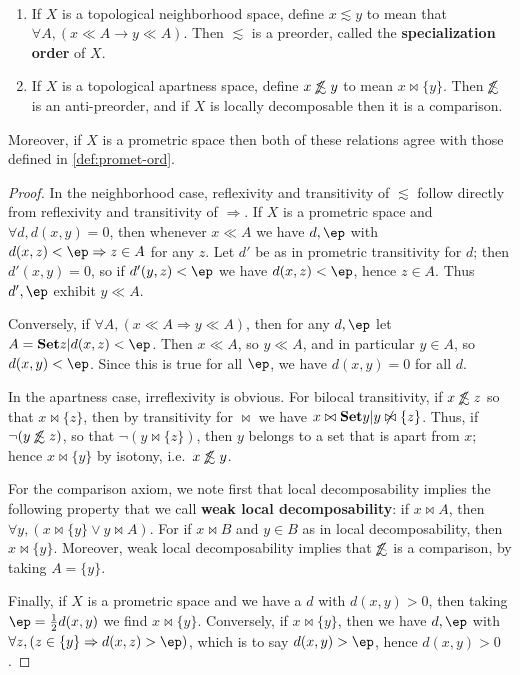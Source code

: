 \documentclass{article}
\def\oapt{\mathrel{\!\not\,\not\lesssim}}
\def\leapx{\lesssim}
\let\implies\Rightarrow
\def\singleton#1{\{#1\}}
\begin{document}
\begin{thm}\label{thm:top-ord}\ 
  \begin{enumerate}
  \item If $X$ is a topological neighborhood space, define $x\leapx y$ to mean that $\forall A, (x\ll A \to y\ll A)$.
    Then $\leapx$ is a preorder, called the \textbf{specialization order} of $X$.
  \item If $X$ is a topological apartness space, define $x\oapt y$ to mean $x \bowtie \singleton{y}$.
    Then $\oapt$ is an anti-preorder, and if $X$ is locally decomposable then it is a comparison.
  \end{enumerate}
  Moreover, if $X$ is a prometric space then both of these relations agree with those defined in \cref{def:promet-ord}.
\end{thm}
\begin{proof}
  In the neighborhood case, reflexivity and transitivity of $\leapx$ follow directly from reflexivity and transitivity of $\implies$.
  If $X$ is a prometric space and $\forall d, d(x,y)=0$, then whenever $x\ll A$ we have $d,\ep$ with $d(x,z)<\ep \implies z\in A$ for any $z$.
  Let $d'$ be as in prometric transitivity for $d$; then $d'(x,y)=0$, so if $d'(y,z)<\ep$ we have $d(x,z)<\ep$, hence $z\in A$.
  Thus $d',\ep$ exhibit $y\ll A$.

  Conversely, if $\forall A, (x\ll A \implies y\ll A)$, then for any $d,\ep$ let $A = \setof{z|d(x,z)<\ep}$.
  Then $x\ll A$, so $y\ll A$, and in particular $y\in A$, so $d(x,y)<\ep$.
  Since this is true for all $\ep$, we have $d(x,y)=0$ for all $d$.

  In the apartness case, irreflexivity is obvious.
  For bilocal transitivity, if $x\oapt z$ so that $x\bowtie \singleton{z}$, then by transitivity for $\bowtie$ we have $x \bowtie \setof{y|y\not \bowtie \singleton{z}}$.
  Thus, if $\neg (y\oapt z)$, so that $\neg (y\bowtie \singleton{z})$, then $y$ belongs to a set that is apart from $x$; hence $x\bowtie \singleton{y}$ by isotony, i.e.\ $x\oapt y$.

  For the comparison axiom, we note first that local decomposability implies the following property that we call \textbf{weak local decomposability}: if $x\bowtie A$, then $\forall y, (x\bowtie \singleton{y} \lor y\bowtie A)$.
  For if $x\bowtie B$ and $y\in B$ as in local decomposability, then $x\bowtie \singleton{y}$.
  Moreover, weak local decomposability implies that $\oapt$ is a comparison, by taking $A = \singleton{y}$.

  Finally, if $X$ is a prometric space and we have a $d$ with $d(x,y)>0$, then taking $\ep=\frac12 d(x,y)$ we find $x\bowtie \singleton{y}$.
  Conversely, if $x\bowtie \singleton{y}$, then we have $d,\ep$ with $\forall z, (z\in \singleton{y} \implies d(x,z)>\ep)$, which is to say $d(x,y)>\ep$, hence $d(x,y)>0$.
\end{proof}
\end{document}
